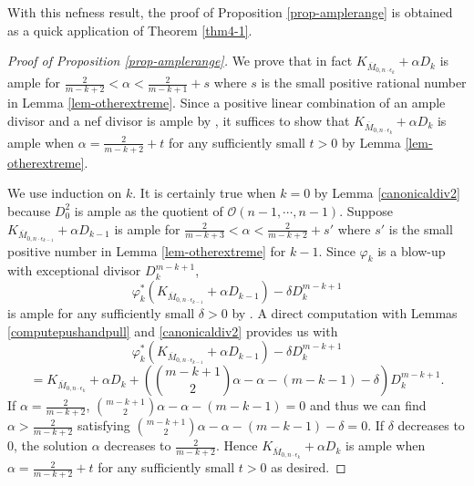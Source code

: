 \documentclass[10pt]{amsart}
\theoremstyle{definition}
\newcommand{\cO}{\mathcal{O} }
\def\Mzek{\overline{M}_{0,n\cdot \epsilon_k} }
\def\Mzeko{\overline{M}_{0,n\cdot \epsilon_{k-1}} }
\begin{document}
With this nefness result, the proof of Proposition
\ref{prop-amplerange} is obtained as a quick application of
Theorem \ref{thm4-1}.

\begin{proof}[Proof of Proposition \ref{prop-amplerange}]
We prove that in fact $K_{\Mzek}+\alpha D_k$ is ample for
$\frac{2}{m-k+2} < \alpha < \frac{2}{m-k+1}+s$ where $s$ is the
small positive rational number in Lemma \ref{lem-otherextreme}.
Since a positive linear combination of an ample divisor and a nef
divisor is ample by \cite[Corollary 1.4.10]{Larz1}, it suffices to
show that $K_{\Mzek}+\alpha D_k$ is ample when $\alpha=
\frac{2}{m-k+2}+t$ for any sufficiently small $t>0$ by Lemma
\ref{lem-otherextreme}.

We use induction on $k$. It is certainly true when $k=0$ by Lemma
\ref{canonicaldiv2} because $D^2_0$ is ample as the quotient of
$\cO(n-1,\cdots,n-1)$. Suppose $K_{\Mzeko}+\alpha D_{k-1}$ is ample
for $\frac{2}{m-k+3} < \alpha < \frac{2}{m-k+2}+s'$ where
$s'$ is the small positive number in Lemma \ref{lem-otherextreme}
for $k-1$.
Since $\varphi_k$ is a blow-up with exceptional divisor $D_k^{m-k+1}$,
\[
    \varphi_k^*(K_{\Mzeko}+\alpha D_{k-1})-\delta D_k^{m-k+1}
\]
is ample for any sufficiently small $\delta>0$ by \cite[II
7.10]{Hartshorne}. A direct computation with Lemmas
\ref{computepushandpull} and \ref{canonicaldiv2} provides us with
\[
\varphi_k^*(K_{\Mzeko}+\alpha D_{k-1})-\delta D_k^{m-k+1}\]  \[
=K_{\Mzek}+\alpha D_{k}+\left( \binom{m-k+1}{2}\alpha
-\alpha-(m-k-1)-\delta \right)D_k^{m-k+1}.
\]
If $\alpha=\frac{2}{m-k+2}$, $\binom{m-k+1}{2}\alpha
-\alpha-(m-k-1)=0$ and thus we can find $\alpha>\frac{2}{m-k+2}$
satisfying $\binom{m-k+1}{2}\alpha -\alpha-(m-k-1)-\delta  =0$. If
$\delta$ decreases to $0$, the solution $\alpha$ decreases to
$\frac{2}{m-k+2}$. Hence $K_{\Mzek}+\alpha D_k$ is ample when
$\alpha= \frac{2}{m-k+2}+t$ for any sufficiently small $t>0$ as
desired.
\end{proof}
\end{document}
